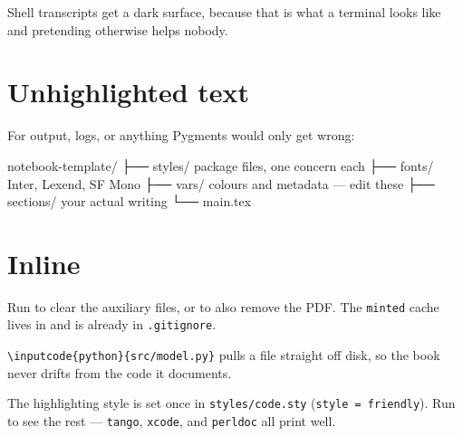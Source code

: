 Shell transcripts get a dark surface, because that is what a terminal looks
like and pretending otherwise helps nobody.


\section{Unhighlighted text}

For output, logs, or anything Pygments would only get wrong:

\begin{plaincode}
notebook-template/
├── styles/     package files, one concern each
├── fonts/      Inter, Lexend, SF Mono
├── vars/       colours and metadata — edit these
├── sections/   your actual writing
└── main.tex
\end{plaincode}

\section{Inline}

Run  to clear the auxiliary files, or  to also
remove the PDF. The \texttt{minted} cache lives in  and is
already in \texttt{.gitignore}.

\begin{tip}
\texttt{\textbackslash inputcode\{python\}\{src/model.py\}} pulls a file
straight off disk, so the book never drifts from the code it documents.
\end{tip}

\begin{note}
The highlighting style is set once in \texttt{styles/code.sty}
(\texttt{style = friendly}). Run  to see the rest —
\texttt{tango}, \texttt{xcode}, and \texttt{perldoc} all print well.
\end{note}
